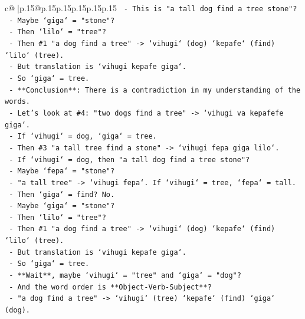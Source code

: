 \documentclass{article}
\begin{document}
{\begin{supertabular}{c@{$\;$}|p{.15\linewidth}@{}p{.15\linewidth}p{.15\linewidth}p{.15\linewidth}p{.15\linewidth}p{.15\linewidth}}
{{{\texttt{                {-}   This is "a tall dog find a tree stone"?} \\
\texttt{                {-}   Maybe `giga` = "stone"?} \\
\texttt{                {-}   Then `lilo` = "tree"?} \\
\texttt{                {-}   Then \#1 "a dog find a tree" {-}> `vihugi` (dog) `kepafe` (find) `lilo` (tree).} \\
\texttt{                {-}   But translation is `vihugi kepafe giga`.} \\
\texttt{                {-}   So `giga` = tree.} \\
\texttt{                {-}   **Conclusion**: There is a contradiction in my understanding of the words.} \\
\texttt{                {-}   Let's look at \#4: "two dogs find a tree" {-}> `vihugi va kepafefe giga`.} \\
\texttt{                {-}   If `vihugi` = dog, `giga` = tree.} \\
\texttt{                {-}   Then \#3 "a tall tree find a stone" {-}> `vihugi fepa giga lilo`.} \\
\texttt{                {-}   If `vihugi` = dog, then "a tall dog find a tree stone"?} \\
\texttt{                {-}   Maybe `fepa` = "stone"?} \\
\texttt{                {-}   "a tall tree" {-}> `vihugi fepa`. If `vihugi` = tree, `fepa` = tall.} \\
\texttt{                {-}   Then `giga` = find? No.} \\
\texttt{                {-}   Maybe `giga` = "stone"?} \\
\texttt{                {-}   Then `lilo` = "tree"?} \\
\texttt{                {-}   Then \#1 "a dog find a tree" {-}> `vihugi` (dog) `kepafe` (find) `lilo` (tree).} \\
\texttt{                {-}   But translation is `vihugi kepafe giga`.} \\
\texttt{                {-}   So `giga` = tree.} \\
\texttt{                {-}   **Wait**, maybe `vihugi` = "tree" and `giga` = "dog"?} \\
\texttt{                {-}   And the word order is **Object{-}Verb{-}Subject**?} \\
\texttt{                {-}   "a dog find a tree" {-}> `vihugi` (tree) `kepafe` (find) `giga` (dog).} \\
}}}
\end{supertabular}}
\end{document}

